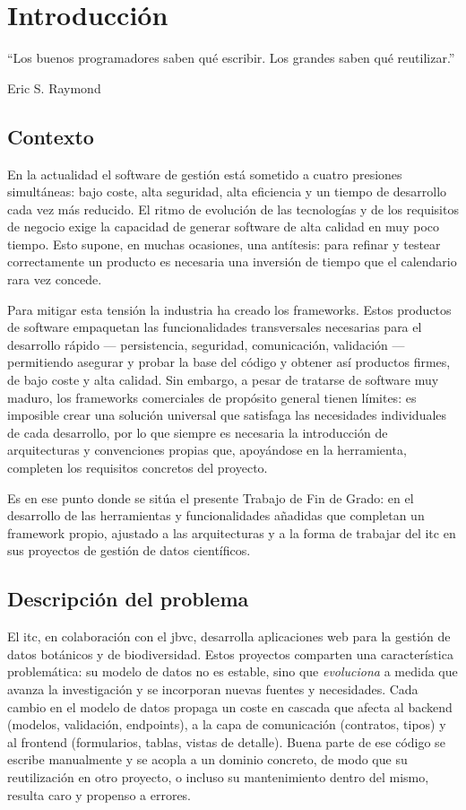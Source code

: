 \chapter{Introducción}
\epigraph{``Los buenos programadores saben qué escribir. Los grandes saben qué reutilizar.''}{Eric S. Raymond \cite{raymond1999cathedral}}

\section{Contexto}
En la actualidad el software de gestión está sometido a cuatro presiones
simultáneas: bajo coste, alta seguridad, alta eficiencia y un tiempo de
desarrollo cada vez más reducido. El ritmo de evolución de las tecnologías y
de los requisitos de negocio exige la capacidad de generar software de alta
calidad en muy poco tiempo. Esto supone, en muchas ocasiones, una antítesis:
para refinar y \gls{testear} correctamente un producto es necesaria una
inversión de tiempo que el calendario rara vez concede.

Para mitigar esta tensión la industria ha creado los \gls{framework}s. Estos
productos de software empaquetan las funcionalidades transversales necesarias
para el desarrollo rápido --- persistencia, seguridad, comunicación, validación
--- permitiendo asegurar y probar la base del código y obtener así productos
firmes, de bajo coste y alta calidad. Sin embargo, a pesar de tratarse de
software muy maduro, los frameworks comerciales de propósito general tienen
límites: es imposible crear una solución universal que satisfaga las
necesidades individuales de cada desarrollo, por lo que siempre es necesaria
la introducción de arquitecturas y convenciones propias que, apoyándose en la
herramienta, completen los requisitos concretos del proyecto.

Es en ese punto donde se sitúa el presente Trabajo de Fin de Grado: en el
desarrollo de las herramientas y funcionalidades añadidas que completan un
framework propio, ajustado a las arquitecturas y a la forma de trabajar del
\gls{itc} en sus proyectos de gestión de datos científicos.

\section{Descripción del problema}
El \gls{itc}, en colaboración con el \gls{jbvc}, desarrolla aplicaciones web
para la gestión de datos botánicos y de biodiversidad. Estos proyectos
comparten una característica problemática: su modelo de datos no es estable,
sino que \emph{evoluciona} a medida que avanza la investigación y se incorporan
nuevas fuentes y necesidades. Cada cambio en el modelo de datos propaga un
coste en cascada que afecta al backend (modelos, validación, endpoints), a la
capa de comunicación (contratos, tipos) y al frontend (formularios, tablas,
vistas de detalle). Buena parte de ese código se escribe manualmente y se
acopla a un dominio concreto, de modo que su reutilización en otro proyecto, o
incluso su mantenimiento dentro del mismo, resulta caro y propenso a errores.

